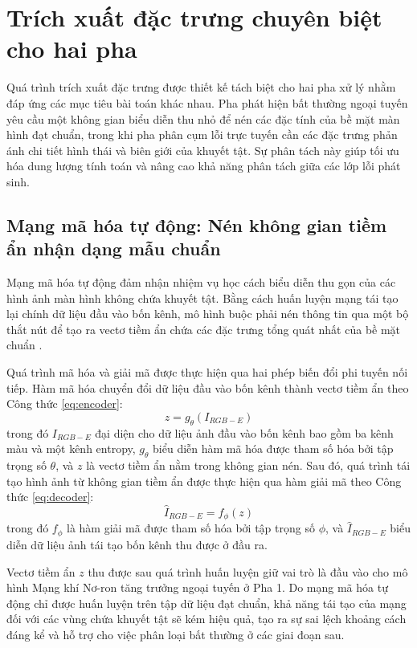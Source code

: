\section{Trích xuất đặc trưng chuyên biệt cho hai pha}
\label{sec:trichxuat_dactrung}

Quá trình trích xuất đặc trưng được thiết kế tách biệt cho hai pha xử lý nhằm đáp ứng các mục tiêu bài toán khác nhau. Pha phát hiện bất thường ngoại tuyến yêu cầu một không gian biểu diễn thu nhỏ để nén các đặc tính của bề mặt màn hình đạt chuẩn, trong khi pha phân cụm lỗi trực tuyến cần các đặc trưng phản ánh chi tiết hình thái và biên giới của khuyết tật. Sự phân tách này giúp tối ưu hóa dung lượng tính toán và nâng cao khả năng phân tách giữa các lớp lỗi phát sinh.

\subsection{Mạng mã hóa tự động: Nén không gian tiềm ẩn nhận dạng mẫu chuẩn}
\label{subsec:autoencoder}

Mạng mã hóa tự động đảm nhận nhiệm vụ học cách biểu diễn thu gọn của các hình ảnh màn hình không chứa khuyết tật. Bằng cách huấn luyện mạng tái tạo lại chính dữ liệu đầu vào bốn kênh, mô hình buộc phải nén thông tin qua một bộ thắt nút để tạo ra vectơ tiềm ẩn chứa các đặc trưng tổng quát nhất của bề mặt chuẩn \cite{kingma2013autoencoding}.

Quá trình mã hóa và giải mã được thực hiện qua hai phép biến đổi phi tuyến nối tiếp. Hàm mã hóa chuyển đổi dữ liệu đầu vào bốn kênh thành vectơ tiềm ẩn theo Công thức \ref{eq:encoder}:
\begin{equation}
\label{eq:encoder}
z = g_\theta(I_{RGB-E})
\end{equation}
trong đó $I_{RGB-E}$ đại diện cho dữ liệu ảnh đầu vào bốn kênh bao gồm ba kênh màu và một kênh entropy, $g_\theta$ biểu diễn hàm mã hóa được tham số hóa bởi tập trọng số $\theta$, và $z$ là vectơ tiềm ẩn nằm trong không gian nén. Sau đó, quá trình tái tạo hình ảnh từ không gian tiềm ẩn được thực hiện qua hàm giải mã theo Công thức \ref{eq:decoder}:
\begin{equation}
\label{eq:decoder}
\hat{I}_{RGB-E} = f_\phi(z)
\end{equation}
trong đó $f_\phi$ là hàm giải mã được tham số hóa bởi tập trọng số $\phi$, và $\hat{I}_{RGB-E}$ biểu diễn dữ liệu ảnh tái tạo bốn kênh thu được ở đầu ra.

Vectơ tiềm ẩn $z$ thu được sau quá trình huấn luyện giữ vai trò là đầu vào cho mô hình Mạng khí Nơ-ron tăng trưởng ngoại tuyến ở Pha 1. Do mạng mã hóa tự động chỉ được huấn luyện trên tập dữ liệu đạt chuẩn, khả năng tái tạo của mạng đối với các vùng chứa khuyết tật sẽ kém hiệu quả, tạo ra sự sai lệch khoảng cách đáng kể và hỗ trợ cho việc phân loại bất thường ở các giai đoạn sau.

